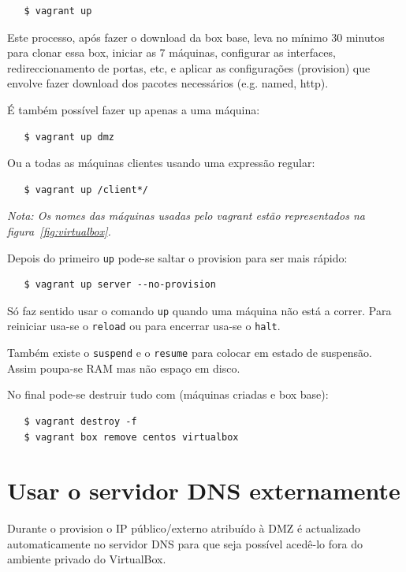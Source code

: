 \documentclass[12pt,a4paper]{report}
\begin{document}
\begin{verbatim}
   $ vagrant up
\end{verbatim}

Este processo, após fazer o download da box base, leva no mínimo 30 minutos para clonar essa box, iniciar as 7 máquinas, configurar as interfaces, redireccionamento de portas, etc, e aplicar as configurações (provision) que envolve fazer download dos pacotes necessários (e.g. named, http).

É também possível fazer up apenas a uma máquina:

\begin{verbatim}
   $ vagrant up dmz
\end{verbatim}

Ou a todas as máquinas clientes usando uma expressão regular:

\begin{verbatim}
   $ vagrant up /client*/
\end{verbatim}

\emph{Nota: Os nomes das máquinas usadas pelo vagrant estão representados na figura~\ref{fig:virtualbox}.}

Depois do primeiro \texttt{up} pode-se saltar o provision para ser mais rápido:

\label{noprovision}
\begin{verbatim}
   $ vagrant up server --no-provision
\end{verbatim}

Só faz sentido usar o comando \texttt{up} quando uma máquina não está a correr. Para reiniciar usa-se o \texttt{reload} ou para encerrar usa-se o \texttt{halt}.

Também existe o \texttt{suspend} e o \texttt{resume} para colocar em estado de suspensão. Assim poupa-se RAM mas não espaço em disco.

No final pode-se destruir tudo com (máquinas criadas e box base):

\begin{verbatim}
   $ vagrant destroy -f
   $ vagrant box remove centos virtualbox
\end{verbatim}

\section{Usar o servidor DNS externamente}

Durante o provision o IP público/externo atribuído à DMZ é actualizado automaticamente no servidor DNS para que seja possível acedê-lo fora do ambiente privado do VirtualBox.
\end{document}
